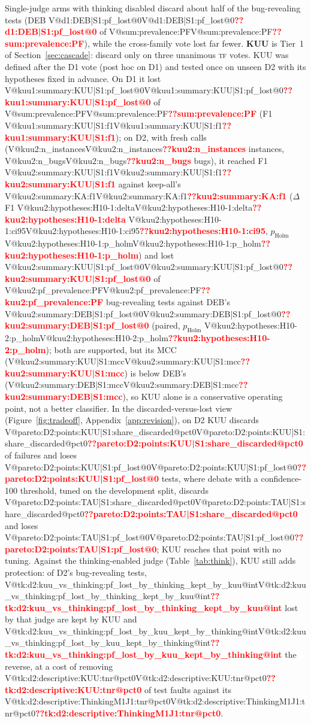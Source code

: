 \documentclass[pdflatex,iicol,sn-mathphys-num]{sn-jnl}
\makeatletter
\newcommand{\V}[1]{\ifcsname V@#1\endcsname\csname V@#1\endcsname\else\textbf{\textcolor{red}{??#1}}\fi}
\newcommand{\TF}{\textsc{tf}}
\makeatother
\begin{document}
Single-judge arms with thinking disabled discard about half of the bug-revealing tests (DEB \V{d1:DEB|S1:pf_lost@0} of \V{sum:prevalence:PF}), while the cross-family vote lost far fewer. \textbf{KUU} is Tier~1 of Section~\ref{sec:cascade}: discard only on three unanimous \TF{} votes. KUU was defined after the D1 vote (post hoc on D1) and tested once on unseen D2 with its hypotheses fixed in advance. On D1 it lost \V{kuu1:summary:KUU|S1:pf_lost@0} of \V{sum:prevalence:PF} (F1 \V{kuu1:summary:KUU|S1:f1}); on D2, with fresh calls (\V{kuu2:n_instances} instances, \V{kuu2:n_bugs} bugs), it reached F1 \V{kuu2:summary:KUU|S1:f1} against keep-all's \V{kuu2:summary:KA:f1} ($\Delta$F1 \V{kuu2:hypotheses:H10-1:delta} \V{kuu2:hypotheses:H10-1:ci95}, $p_\mathrm{Holm}$ \V{kuu2:hypotheses:H10-1:p_holm}) and lost \V{kuu2:summary:KUU|S1:pf_lost@0} of \V{kuu2:pf_prevalence:PF} bug-revealing tests against DEB's \V{kuu2:summary:DEB|S1:pf_lost@0} (paired, $p_\mathrm{Holm}$ \V{kuu2:hypotheses:H10-2:p_holm}); both are supported, but its MCC (\V{kuu2:summary:KUU|S1:mcc}) is below DEB's (\V{kuu2:summary:DEB|S1:mcc}), so KUU alone is a conservative operating point, not a better classifier. In the discarded-versus-lost view (Figure~\ref{fig:tradeoff}, Appendix~\ref{app:revision}), on D2 KUU discards \V{pareto:D2:points:KUU|S1:share_discarded@pct0} of failures and loses \V{pareto:D2:points:KUU|S1:pf_lost@0} tests, where debate with a confidence-100 threshold, tuned on the development split, discards \V{pareto:D2:points:TAU|S1:share_discarded@pct0} and loses \V{pareto:D2:points:TAU|S1:pf_lost@0}; KUU reaches that point with no tuning. Against the thinking-enabled judge (Table~\ref{tab:think}), KUU still adds protection: of D2's bug-revealing tests, \V{tk:d2:kuu_vs_thinking:pf_lost_by_thinking_kept_by_kuu@int} lost by that judge are kept by KUU and \V{tk:d2:kuu_vs_thinking:pf_lost_by_kuu_kept_by_thinking@int} the reverse, at a cost of removing \V{tk:d2:descriptive:KUU:tnr@pct0} of test faults against its \V{tk:d2:descriptive:ThinkingM1J1:tnr@pct0}.
\end{document}
